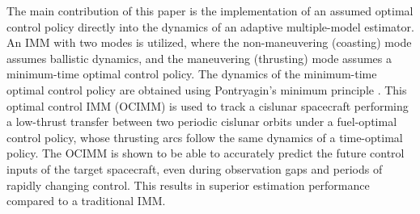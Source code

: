 The main contribution of this paper is the implementation of an assumed optimal control policy directly into the dynamics of an adaptive multiple-model estimator. An IMM with two modes is utilized, where the non-maneuvering (coasting) mode assumes ballistic dynamics, and the maneuvering (thrusting) mode assumes a minimum-time optimal control policy. The dynamics of the minimum-time optimal control policy are obtained using Pontryagin's minimum principle \cite{pontryagin1962}. This optimal control IMM (OCIMM) is used to track a cislunar spacecraft performing a low-thrust transfer between two periodic cislunar orbits under a fuel-optimal control policy, whose thrusting arcs follow the same dynamics of a time-optimal policy. The OCIMM is shown to be able to accurately predict the future control inputs of the target spacecraft, even during observation gaps and periods of rapidly changing control. This results in superior estimation performance compared to a traditional IMM. 
